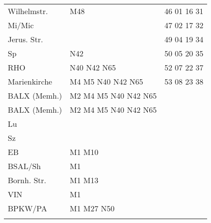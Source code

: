 \begin{tabular}{!{\color{schiefergrau}\vrule width 3pt}*{3}{l!{\color{schiefergrau}\vrule width 3pt}}}
Wilhelmstr.  & \mbus{} M48                                                       & 46 01 16 31 \\
Mi/Mic       & \nusechs{}                                                        & 47 02 17 32 \\
Jerus. Str.  &                                                                   & 49 04 19 34 \\
Sp           & \nbus{} N42                                                       & 50 05 20 35 \\
RHO          & \nuacht{} \nbus{} N40 N42 N65                                     & 52 07 22 37 \\
Marienkirche & \nufuenf{} \nuacht{} \mtram{} M4 M5 \nbus{} N40 N42 N65           & 53 08 23 38 \\
BALX (Memh.) & \nufuenf{} \nuacht{} \mtram{} M2 M4 M5 \nbus{} N40 N42 N65        & \\
\hline
BALX (Memh.) & \nufuenf{} \nuacht{} \mtram{} M2 M4 M5 \nbus{} N40 N42 N65        & \\
Lu           &                                                                   & \\
Sz           &                                                                   & \\
EB           & \mtram{} M1 M10                                                   & \\
BSAL/Sh      & \mtram{} M1                                                       & \\
Bornh. Str.  & \mtram{} M1 M13                                                   & \\
VIN          & \mtram{} M1                                                       & \\
BPKW/PA      & \mtram{} M1 \mbus{} M27 \nbus{} N50                               & \\
\myhline
\end{tabular}
